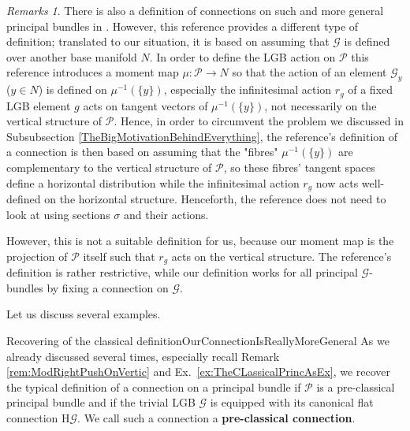 \documentclass[a4paper,oneside,11pt,bibliography=totoc]{scrartcl}
\theoremstyle{plain}
\theoremstyle{remark}
\newtheorem{remark}[theorem]{Remarks}
\theoremstyle{definition}
\begin{document}
\begin{remark}
\leavevmode\newline
There is also a definition of connections on such and more general principal bundles in \cite[\S 5.7, paragraph before Prop.\ 5.38, page 148]{GroupoidBasedPrincipalBundles}. However, this reference provides a different type of definition; translated to our situation, it is based on assuming that $\mathcal{G}$ is defined over another base manifold $N$. In order to define the LGB action on $\mathcal{P}$ this reference introduces a moment map $\mu: \mathcal{P} \to N$ so that the action of an element $\mathcal{G}_y$ ($y \in N$) is defined on $\mu^{-1}(\{y\})$, especially the infinitesimal action $r_g$ of a fixed LGB element $g$ acts on tangent vectors of $\mu^{-1}(\{y\})$, not necessarily on the vertical structure of $\mathcal{P}$. Hence, in order to circumvent the problem we discussed in Subsubsection \ref{TheBigMotivationBehindEverything}, the reference's definition of a connection is then based on assuming that the "fibres" $\mu^{-1}(\{y\})$ are complementary to the vertical structure of $\mathcal{P}$, so these fibres' tangent spaces define a horizontal distribution while the infinitesimal action $r_g$ now acts well-defined on the horizontal structure. Henceforth, the reference does not need to look at using sections $\sigma$ and their actions.

However, this is not a suitable definition for us, because our moment map is the projection of $\mathcal{P}$ itself such that $r_g$ acts on the vertical structure. The reference's definition is rather restrictive, while our definition works for all principal $\mathcal{G}$-bundles by fixing a connection on $\mathcal{G}$.
\end{remark}

Let us discuss several examples.

\begin{examples}{Recovering of the classical definition}{OurConnectionIsReallyMoreGeneral}
As we already discussed several times, especially recall Remark \ref{rem:ModRightPushOnVertic} and Ex.\ \ref{ex:TheCLassicalPrincAsEx}, we recover the typical definition of a connection on a principal bundle if $\mathcal{P}$ is a pre-classical principal bundle and if the trivial LGB $\mathcal{G}$ is equipped with its canonical flat connection $\mathrm{H}\mathcal{G}$. We call such a connection a \textbf{pre-classical connection}.
\end{examples}
\end{document}
